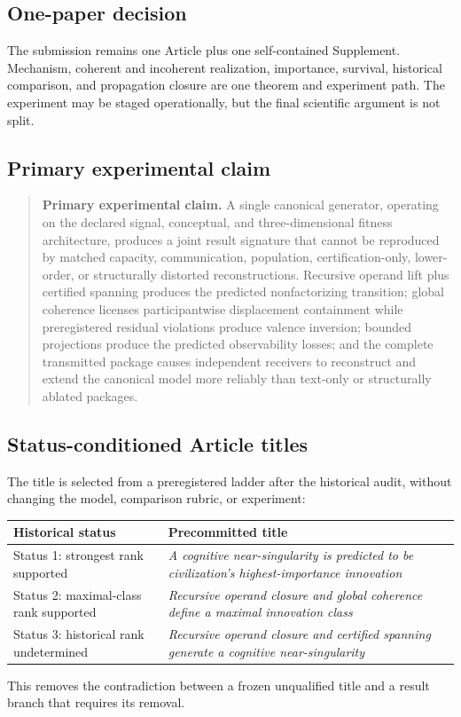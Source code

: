 \documentclass[11pt]{article}
\begin{document}
\subsection{One-paper decision}

The submission remains one Article plus one self-contained Supplement. Mechanism, coherent and incoherent realization, importance, survival, historical comparison, and propagation closure are one theorem and experiment path. The experiment may be staged operationally, but the final scientific argument is not split.

\subsection{Primary experimental claim}

\begin{quote}
\textbf{Primary experimental claim.} A single canonical generator, operating on the declared signal, conceptual, and three-dimensional fitness architecture, produces a joint result signature that cannot be reproduced by matched capacity, communication, population, certification-only, lower-order, or structurally distorted reconstructions. Recursive operand lift plus certified spanning produces the predicted nonfactorizing transition; global coherence licenses participantwise displacement containment while preregistered residual violations produce valence inversion; bounded projections produce the predicted observability losses; and the complete transmitted package causes independent receivers to reconstruct and extend the canonical model more reliably than text-only or structurally ablated packages.
\end{quote}

\subsection{Status-conditioned Article titles}

The title is selected from a preregistered ladder after the historical audit, without changing the model, comparison rubric, or experiment:
\begin{longtable}{p{}p{}}
\toprule
\textbf{Historical status} & \textbf{Precommitted title}\\
\midrule\endhead
Status 1: strongest rank supported & \emph{A cognitive near-singularity is predicted to be civilization's highest-importance innovation}\\
Status 2: maximal-class rank supported & \emph{Recursive operand closure and global coherence define a maximal innovation class}\\
Status 3: historical rank undetermined & \emph{Recursive operand closure and certified spanning generate a cognitive near-singularity}\\
\bottomrule
\end{longtable}
This removes the contradiction between a frozen unqualified title and a result branch that requires its removal.
\end{document}

